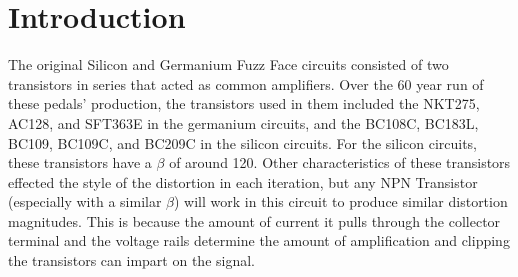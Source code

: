 \documentclass[%
reprint,
amsmath,amssymb,
aps,       
author-year 
]{revtex4-2}
\begin{document}
\section{Introduction}

The original Silicon and Germanium Fuzz Face circuits consisted of two transistors in series that acted as common amplifiers. Over the 60 year run of these pedals' production, the transistors used in them included the NKT275, AC128, and SFT363E in the germanium circuits, and the BC108C, BC183L, BC109, BC109C, and BC209C in the silicon circuits. For the silicon circuits, these transistors have a $\beta$ of around 120. Other characteristics of these transistors effected the style of the distortion in each iteration, but any NPN Transistor (especially with a similar $\beta$) will work in this circuit to produce similar distortion magnitudes. This is because the amount of current it pulls through the collector terminal and the voltage rails determine the amount of amplification and clipping the transistors can impart on the signal. 
\end{document}
